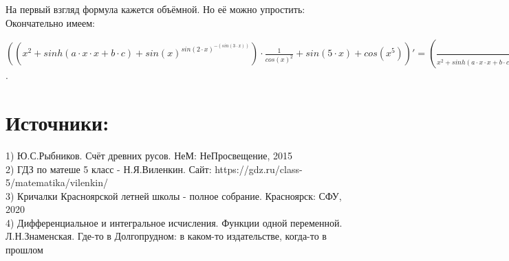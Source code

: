 \documentclass{article}
\begin{document}
На первый взгляд формула кажется объёмной. Но её можно упростить:\\
Окончательно имеем:\\
\begin{center}$(({x^{{2}}}+sinh(a \cdot x \cdot x+b \cdot c)+{sin(x)^{sin({2} \cdot x)^{-(sin({3} \cdot x))}}}) \cdot  \frac {1} {{{cos(x)^{{2}}}}}+sin({5} \cdot x)+cos({x^{{5}}}))' = ( \frac {1} {{{x^{{2}}}+sinh(a \cdot x \cdot x+b \cdot c)+{sin(x)^{sin({2} \cdot x)^{-(sin({3} \cdot x))}}}}} \cdot ({x^{{2}}} \cdot {2} \cdot  \frac {1} {{x}}+cosh(a \cdot x \cdot x+b \cdot c) \cdot ( \frac {1} {{x}}+ \frac {1} {{x}}) \cdot a \cdot x \cdot x+{sin(x)^{sin({2} \cdot x)^{-(sin({3} \cdot x))}}} \cdot (cos(x) \cdot  \frac {1} {{sin(x)}} \cdot  \frac {1} {{sin({2} \cdot x)} ^ {sin({3} \cdot x)}}+log(sin(x)) \cdot  \frac {1} {{sin({2} \cdot x)} ^ {sin({3} \cdot x)}} \cdot (cos({2} \cdot x) \cdot  \frac {1} {{x}} \cdot {2} \cdot x \cdot  \frac {1} {{sin({2} \cdot x)}} \cdot -(sin({3} \cdot x))+log(sin({2} \cdot x)) \cdot -(cos({3} \cdot x) \cdot  \frac {1} {{x}} \cdot {3} \cdot x))))+{cos(x)^{{2}^{{-1}^{{-1}}}}} \cdot {cos(x)^{{2}^{{-1}}}} \cdot {cos(x)^{{2}}} \cdot -(sin(x)) \cdot  \frac {1} {{cos(x)}} \cdot {-2} \cdot {cos(x)^{{2}^{{-1}}}}) \cdot ({x^{{2}}}+sinh(a \cdot x \cdot x+b \cdot c)+{sin(x)^{sin({2} \cdot x)^{-(sin({3} \cdot x))}}}) \cdot {cos(x)^{{2}^{{-1}}}}+cos({5} \cdot x) \cdot  \frac {1} {{x}} \cdot {5} \cdot x+-(sin({x^{{5}}})) \cdot {x^{{5}}} \cdot {5} \cdot  \frac {1} {{x}}$.\end{center}
\section{ Источники: }1) Ю.С.Рыбников. Счёт древних русов. НеМ: НеПросвещение, 2015 \\
2) ГДЗ по матеше 5 класс - Н.Я.Виленкин. Сайт: https://gdz.ru/class-5/matematika/vilenkin/\\
3) Кричалки Красноярской летней школы - полное собрание. Красноярск: СФУ, 2020\\
4) Дифференциальное и интегральное исчисления. Функции одной переменной. Л.Н.Знаменская. Где-то в Долгопрудном: в каком-то издательстве, когда-то в прошлом\\
\end{document}
